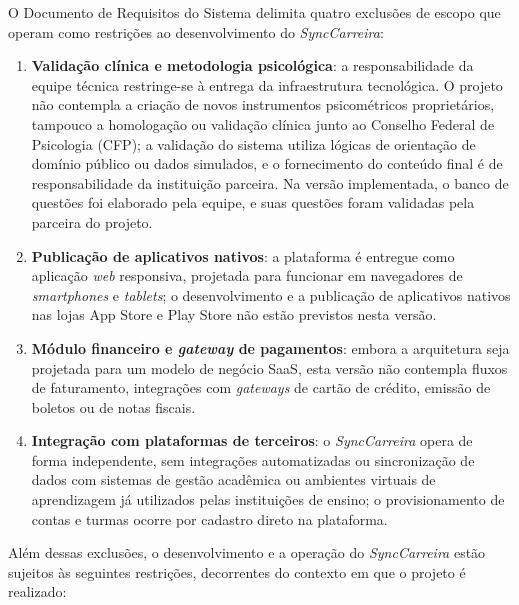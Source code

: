 O Documento de Requisitos do Sistema delimita quatro exclusões de escopo que operam como restrições ao desenvolvimento do \textit{SyncCarreira}:

\begin{enumerate}[label=\alph*)]
  \item \textbf{Validação clínica e metodologia psicológica}: a responsabilidade da equipe técnica restringe-se à entrega da infraestrutura tecnológica. O projeto não contempla a criação de novos instrumentos psicométricos proprietários, tampouco a homologação ou validação clínica junto ao Conselho Federal de Psicologia (CFP); a validação do sistema utiliza lógicas de orientação de domínio público ou dados simulados, e o fornecimento do conteúdo final é de responsabilidade da instituição parceira. Na versão implementada, o banco de questões foi elaborado pela equipe, e suas questões foram validadas pela parceira do projeto.
  \item \textbf{Publicação de aplicativos nativos}: a plataforma é entregue como aplicação \textit{web} responsiva, projetada para funcionar em navegadores de \textit{smartphones} e \textit{tablets}; o desenvolvimento e a publicação de aplicativos nativos nas lojas App Store e Play Store não estão previstos nesta versão.
  \item \textbf{Módulo financeiro e \textit{gateway} de pagamentos}: embora a arquitetura seja projetada para um modelo de negócio SaaS, esta versão não contempla fluxos de faturamento, integrações com \textit{gateways} de cartão de crédito, emissão de boletos ou de notas fiscais.
  \item \textbf{Integração com plataformas de terceiros}: o \textit{SyncCarreira} opera de forma independente, sem integrações automatizadas ou sincronização de dados com sistemas de gestão acadêmica ou ambientes virtuais de aprendizagem já utilizados pelas instituições de ensino; o provisionamento de contas e turmas ocorre por cadastro direto na plataforma.
\end{enumerate}

Além dessas exclusões, o desenvolvimento e a operação do \textit{SyncCarreira} estão sujeitos às seguintes restrições, decorrentes do contexto em que o projeto é realizado:

